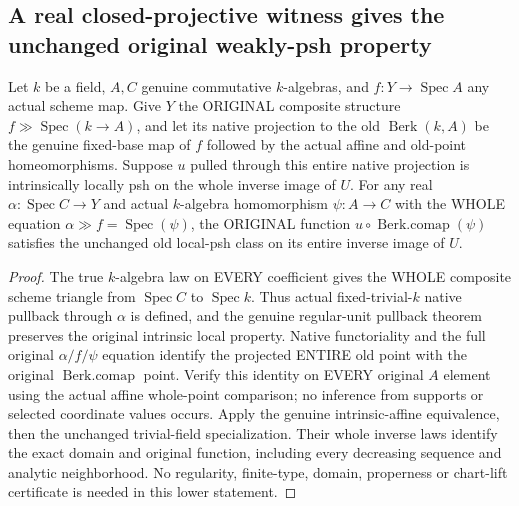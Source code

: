 \subsection{A real closed-projective witness gives the unchanged original weakly-psh property}

\begin{lemma}
\label{paper:actual-native-witness-affine-chart-pullback}

Let $k$ be a field, $A,C$ genuine commutative $k$-algebras, and
$f:Y\to\operatorname{Spec}A$ any actual scheme map. Give $Y$ the ORIGINAL
composite structure $f\gg\operatorname{Spec}(k\to A)$, and let its native
projection to the old $\operatorname{Berk}(k,A)$ be the genuine fixed-base map
of $f$ followed by the actual affine and old-point homeomorphisms.
Suppose $u$ pulled through this entire native projection is intrinsically
locally psh on the whole inverse image of $U$.
For any real $\alpha:\operatorname{Spec}C\to Y$ and actual
$k$-algebra homomorphism $\psi:A\to C$ with the WHOLE equation
$\alpha\gg f=\operatorname{Spec}(\psi)$, the ORIGINAL function
$u\circ\operatorname{Berk.comap}(\psi)$ satisfies the unchanged old local-psh
class on its entire inverse image of $U$.
\end{lemma}
\begin{proof}
The true $k$-algebra law on EVERY coefficient gives the WHOLE composite scheme
triangle from $\operatorname{Spec}C$ to $\operatorname{Spec}k$. Thus actual
fixed-trivial-$k$ native pullback through $\alpha$ is defined, and the genuine
regular-unit pullback theorem preserves the original intrinsic local property.
Native functoriality and the full original $\alpha/f/\psi$ equation identify
the projected ENTIRE old point with the original $\operatorname{Berk.comap}$
point. Verify this identity on EVERY original $A$ element using the actual
affine whole-point comparison; no inference from supports or selected
coordinate values occurs. Apply the genuine intrinsic-affine equivalence,
then the unchanged trivial-field specialization. Their whole inverse laws
identify the exact domain and original function, including every decreasing
sequence and analytic neighborhood. No regularity, finite-type, domain,
properness or chart-lift certificate is needed in this lower statement.
\end{proof}


